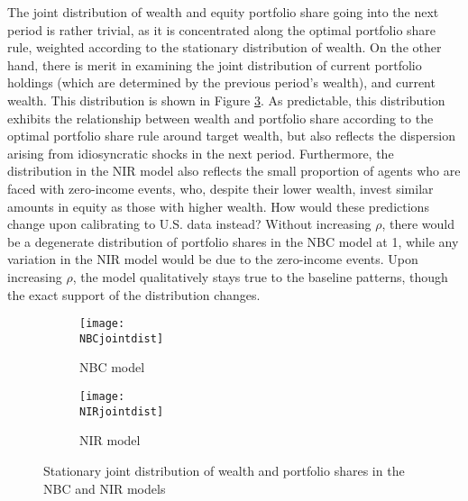 The joint distribution of wealth and equity portfolio share going into the next period is rather trivial, as it is concentrated along the optimal portfolio share rule, weighted according to the stationary distribution of wealth. On the other hand, there is merit in examining the joint distribution of current portfolio holdings (which are determined by the previous period's wealth), and current wealth. This distribution is shown in Figure \ref{fig:jointdist}. As predictable, this distribution exhibits the relationship between wealth and portfolio share according to the optimal portfolio share rule around target wealth, but also reflects the dispersion arising from idiosyncratic shocks in the next period. Furthermore, the distribution in the NIR model also reflects the small proportion of agents who are faced with zero-income events, who, despite their lower wealth, invest similar amounts in equity as those with higher wealth. How would these predictions change upon calibrating to U.S. data instead? Without increasing $\rho$, there would be a degenerate distribution of portfolio shares in the NBC model at 1, while any variation in the NIR model would be due to the zero-income events. Upon increasing $\rho$, the model qualitatively stays true to the baseline patterns, though the exact support of the distribution changes.
\begin{figure}[h]
    \centering
    \begin{subfigure}{0.49\textwidth}
        \centering
        \texttt{[image: \\NBCjointdist]}
        \caption{NBC model}
        \label{subfig:NBCjointdist}
    \end{subfigure}
    \begin{subfigure}{0.49\textwidth}
        \centering
        \texttt{[image: \\NIRjointdist]}
        \caption{NIR model}
        \label{subfig:NIRjointdist}
    \end{subfigure}
    \caption{Stationary joint distribution of wealth and portfolio shares in the NBC and NIR models}
    \label{fig:jointdist}
\end{figure}